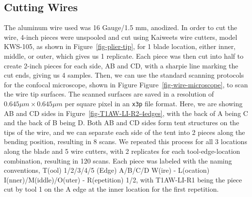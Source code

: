 \documentclass[fleqn,10pt]{wlscirep}
\begin{document}
\subsection*{Cutting Wires}\label{sec-cutting-wires}

The aluminum wire used was 16 Gauge/1.5 mm, anodized. In order to cut
the wire, 4-inch pieces were unspooled and cut using Kaiweets wire
cutters, model KWS-105, as shown in Figure~\ref{fig-plier-tip}, for 1
blade location, either inner, middle, or outer, which gives us 1
replicate. Each piece was then cut into half to create 2-inch pieces for
each side, AB and CD, with a sharpie line marking the cut ends, giving
us 4 samples. Then, we can use the standard scanning protocols for the
confocal microscope, shown in Figure Figure~\ref{fig-wire-microscope},
to scan the wire tip surfaces. The scanned surfaces are saved in a
resolution of \(0.645 \mu m \times 0.645 \mu m\) per square pixel in an
\texttt{x3p} file format. Here, we are showing AB and CD sides in
Figure~\ref{fig-T1AW-LI-R2-4edges}, with the back of A being C and the
back of B being D. Both AB and CD sides form tent structures on the tips
of the wire, and we can separate each side of the tent into 2 pieces
along the bending position, resulting in 8 scans. We repeated this
process for all 3 locations along the blade and 5 wire cutters, with 2
replicates for each tool-edge-location combination, resulting in 120
scans. Each piece was labeled with the naming conventions, T(ool)
1/2/3/4/5 (Edge) A/B/C/D W(ire) - L(ocation) I(nner)/M(iddle)/O(uter) -
R(epetition) 1/2, with T1AW-LI-R1 being the piece cut by tool 1 on the A
edge at the inner location for the first repetition.
\end{document}
